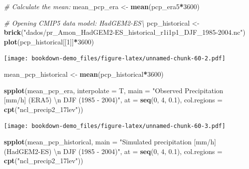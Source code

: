\documentclass[]{book}
\newenvironment{Shaded}{\begin{snugshade}}{\end{snugshade}}
\newcommand{\CharTok}[1]{\textcolor[rgb]{0.31,0.60,0.02}{#1}}
\newcommand{\CommentTok}[1]{\textcolor[rgb]{0.56,0.35,0.01}{\textit{#1}}}
\newcommand{\DataTypeTok}[1]{\textcolor[rgb]{0.13,0.29,0.53}{#1}}
\newcommand{\DecValTok}[1]{\textcolor[rgb]{0.00,0.00,0.81}{#1}}
\newcommand{\FloatTok}[1]{\textcolor[rgb]{0.00,0.00,0.81}{#1}}
\newcommand{\KeywordTok}[1]{\textcolor[rgb]{0.13,0.29,0.53}{\textbf{#1}}}
\newcommand{\NormalTok}[1]{#1}
\newcommand{\OperatorTok}[1]{\textcolor[rgb]{0.81,0.36,0.00}{\textbf{#1}}}
\newcommand{\StringTok}[1]{\textcolor[rgb]{0.31,0.60,0.02}{#1}}
\begin{document}
\begin{Shaded}
\begin{Highlighting}[]
\CommentTok{# Calculate the mean:}
\NormalTok{mean_pcp_era <-}\StringTok{ }\KeywordTok{mean}\NormalTok{(pcp_era5}\OperatorTok{*}\DecValTok{3600}\NormalTok{)}

\CommentTok{# Opening CMIP5 data model: HadGEM2-ES\textbackslash{}}
\NormalTok{pcp_historical <-}\StringTok{ }\KeywordTok{brick}\NormalTok{(}\StringTok{"dados/pr_Amon_HadGEM2-ES_historical_r1i1p1_DJF_1985-2004.nc"}\NormalTok{)}
\KeywordTok{plot}\NormalTok{(pcp_historical[[}\DecValTok{1}\NormalTok{]]}\OperatorTok{*}\DecValTok{3600}\NormalTok{)}
\end{Highlighting}
\end{Shaded}

\texttt{[image: bookdown-demo\_files/figure-latex/unnamed-chunk-60-2.pdf]}

\begin{Shaded}
\begin{Highlighting}[]
\NormalTok{mean_pcp_historical <-}\StringTok{ }\KeywordTok{mean}\NormalTok{(pcp_historical}\OperatorTok{*}\DecValTok{3600}\NormalTok{)}

\KeywordTok{spplot}\NormalTok{(mean_pcp_era, }\DataTypeTok{interpolate =}\NormalTok{ T,}
            \DataTypeTok{main =} \StringTok{"Observed Precipitation [mm/h] (ERA5) }\CharTok{\textbackslash{}n}\StringTok{ DJF (1985 - 2004)"}\NormalTok{,}
            \DataTypeTok{at =} \KeywordTok{seq}\NormalTok{(}\DecValTok{0}\NormalTok{, }\DecValTok{4}\NormalTok{, }\FloatTok{0.1}\NormalTok{),}
            \DataTypeTok{col.regions =} \KeywordTok{cpt}\NormalTok{(}\StringTok{"ncl_precip2_17lev"}\NormalTok{))}
\end{Highlighting}
\end{Shaded}

\texttt{[image: bookdown-demo\_files/figure-latex/unnamed-chunk-60-3.pdf]}

\begin{Shaded}
\begin{Highlighting}[]
\KeywordTok{spplot}\NormalTok{(mean_pcp_historical,}
            \DataTypeTok{main =} \StringTok{"Simulated precipitation [mm/h] (HadGEM2-ES) }\CharTok{\textbackslash{}n}\StringTok{ DJF (1985 - 2004)"}\NormalTok{,}
            \DataTypeTok{at =} \KeywordTok{seq}\NormalTok{(}\DecValTok{0}\NormalTok{, }\DecValTok{4}\NormalTok{, }\FloatTok{0.1}\NormalTok{),}
            \DataTypeTok{col.regions =} \KeywordTok{cpt}\NormalTok{(}\StringTok{"ncl_precip2_17lev"}\NormalTok{))}
\end{Highlighting}
\end{Shaded}
\end{document}
